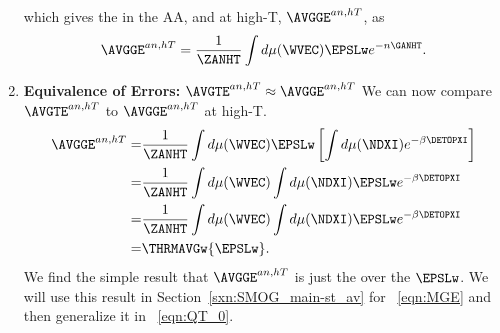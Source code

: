 \begin{enumerate}[label=4.2.5.\arabic*]
which gives the \AverageModelGeneralizationAccuracy in the AA, and at high-T, $\AVGGE^{an, hT}$, as
\begin{align}
  \label{eqn:avgge_anhT}
  \AVGGE^{an, hT} = \frac{1}{\ZANHT}\int d\mu(\WVEC) \EPSLw e^{-n\GANHT}  .
\end{align}
\item
\textbf{Equivalence of Errors: $\AVGTE^{an,hT}\approx\AVGGE^{an, hT}$}
We can now compare $\AVGTE^{an, hT}$ to $\AVGGE^{an,hT}$ at high-T.
\begin{align}
\nonumber
  \AVGGE^{an,hT}
  =& \frac{1}{\ZANHT}\int d\mu(\WVEC)\EPSLw \left[\int d\mu(\NDXI)e^{-\beta \DETOPXI}\right] \\ 
\nonumber
  =& \frac{1}{\ZANHT}\int d\mu(\WVEC) \int d\mu(\NDXI) \EPSLw e^{-\beta \DETOPXI}\\ 
\nonumber
  =& \frac{1}{\ZANHT}\int d\mu(\WVEC) \int d\mu(\NDXI) \EPSLw e^{-\beta \DETOPXI}\\ 
\label{eqn:finalEgen}
  =& \THRMAVGw{\EPSLw}   .
\end{align}
We find the simple result that $\AVGGE^{an, hT}$ is just the \ThermalAverage over the \EffectivePotential $\EPSLw$.
We will use this result in 
Section~\ref{sxn:SMOG_main-st_av}   %
for \EQN~\ref{eqn:MGE} and then generalize it
in \EQN~\ref{eqn:QT_0}.

\end{enumerate}
